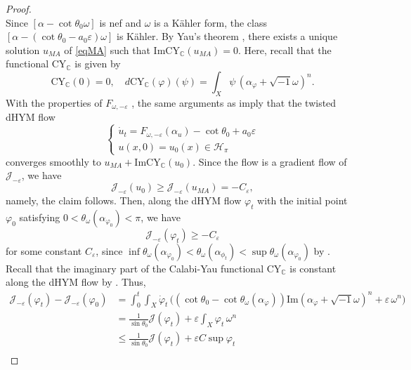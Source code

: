 \documentclass[10pt,a4paper]{amsart}
\begin{document}
\begin{proof}
\begin{equation}
    \end{equation}
    Since $[\alpha-\cot{\theta_0}\omega]$ is nef and $\omega$ is a K{\"a}hler form, the class $[\alpha-(\cot{\theta_0}-a_0\varepsilon)\omega]$ is K{\"a}hler. By Yau's theorem \cite{Yau}, there exists a unique solution $u_{MA}$ of \eqref{eqMA} such that $\mathrm{Im}\mathrm{CY}_\mathbb{C}(u_{MA})=0$. Here, recall that the functional $\mathrm{CY}_\mathbb{C}$ is given by
    $$\mathrm{CY}_\mathbb{C}(0)=0,\quad d\mathrm{CY}_\mathbb{C}(\varphi)(\psi)=\int_X \psi \, (\alpha_\varphi+\sqrt{-1}\omega)^n.$$
    With the properties of $F_{\omega,-\varepsilon}$ \cite[Lemma 5.6]{GChen}, the same arguments as \cite[Section 4.2]{CL} imply that the twisted dHYM flow
    \begin{equation}\label{eqtdHYMflow}
        \begin{cases}
        \dot{u}_t=F_{\omega,-\varepsilon}(\alpha_u)-\cot{\theta_0}+a_0\varepsilon \\ u(x,0)=u_0(x)\in \mathcal{H}_\pi
        \end{cases}
    \end{equation}
    converges smoothly to $u_{MA}+\mathrm{Im}\mathrm{CY}_\mathbb{C}(u_0)$. Since the flow is a gradient flow of $\mathcal{J}_{-\varepsilon}$, we have
    $$\mathcal{J}_{-\varepsilon}(u_0)\ge\mathcal{J}_{-\varepsilon}(u_{MA})=-C_\varepsilon,$$
    namely, the claim follows.
    Then, along the dHYM flow $\varphi_t$ with the initial point $\varphi_0$ satisfying $0<\theta_\omega(\alpha_{\varphi_0}) < \pi$, we have
    \begin{equation}\label{ineqbdd}
        \mathcal{J}_{-\varepsilon}(\varphi_t)\ge - C_\varepsilon
    \end{equation}
    for some constant $C_\varepsilon$, since 
    $\inf\theta_\omega(\alpha_{\varphi_0})<\theta_\omega(\alpha_{\phi_t})<\sup\theta_\omega(\alpha_{\varphi_0})$
    by \cite[Lemma 3.2]{FYZ}. Recall that the imaginary part of the Calabi-Yau functional $\mathrm{CY}_\mathbb{C}$ 
    is constant along the dHYM flow by \cite[Lemma 2.7]{FYZ}. Thus,
    \begin{align*}
        \mathcal{J}_{-\varepsilon}(\varphi_t)-\mathcal{J}_{-\varepsilon}(\varphi_0)
        &=\int^t_0\int_X \dot{\varphi}_t \, \biggl( (\cot{\theta_0}-\cot{\theta_\omega(\alpha_\varphi)})\mathrm{Im}(\alpha_\varphi+\sqrt{-1}\omega)^n+\varepsilon\, \omega^n\biggr)\\
        &=\frac{1}{\sin{\theta_0}}\mathcal{J}(\varphi_t)+\varepsilon\int_X\varphi_t\, \omega^n\\
        &\le\frac{1}{\sin{\theta_0}}\mathcal{J}(\varphi_t)+\varepsilon C\sup\varphi_t\\

\end{align*}
\end{proof}
\end{document}
